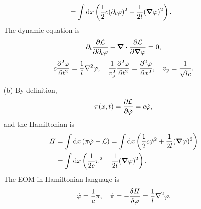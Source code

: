 \documentclass[hyperref, a4paper]{article}
\begin{document}
\begin{itemize}
\begin{equation}
\begin{aligned}
        &= \int \dd{x} \left(
            \frac{1}{2} c (\partial_t \varphi)^2 - \frac{1}{2 l} (\grad{\varphi})^2
        \right).
    \end{aligned}
\end{equation}
The dynamic equation is 
\[
    \partial_t \pdv{\mathcal{L}}{\partial_t \varphi} + \div \pdv{\mathcal{L}}{\grad{\varphi}} = 0,
\]
\begin{equation}
    c \pdv[2]{\varphi}{t} = \frac{1}{l} \laplacian \varphi, \quad 
    \frac{1}{v_{\text{p}}^2} \pdv[2]{\varphi}{t} = \pdv[2]{\varphi}{x}, \quad 
    v_{\text{p}} = \frac{1}{\sqrt{lc}}.
    \label{eq:telegraph-eq}
\end{equation}

\item[(b)] By definition, 
\begin{equation}
    \pi(x, t) = \pdv{\mathcal{L}}{\dot{\varphi}} = c \dot{\varphi},
\end{equation}
and the Hamiltonian is 
\begin{equation}
    \begin{aligned}
        H &= \int \dd{x} (\pi \dot{\varphi} - \mathcal{L}) 
        = \int \dd{x} \left( \frac{1}{2} c \dot{\varphi}^2 + \frac{1}{2l} (\grad{\varphi})^2 \right) \\
        &= \int \dd{x} \left( \frac{1}{2c} \pi^2 + \frac{1}{2l} (\grad{\varphi})^2 \right) .
    \end{aligned}
\end{equation}
The EOM in Hamiltonian language is 
\begin{equation}
    \dot{\varphi} = \frac{1}{c} \pi, \quad 
    \dot{\pi} = - \fdv{H}{\varphi} = \frac{1}{l} \laplacian \varphi.
\end{equation}


\end{itemize}
\end{document}

